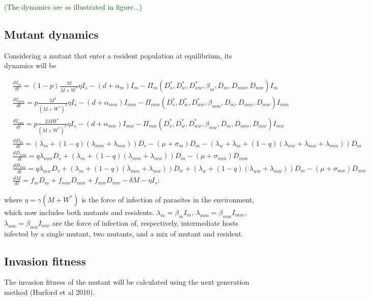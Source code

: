 \documentclass{article}
\newcommand{\cha}[1]{\textcolor{darkgreen}{(#1)}}
\begin{document}
\cha{The dynamics are as illustrated in figure...}

\newpage 
\subsection{Mutant dynamics}

Considering a mutant that enter a resident population at equilibrium, its dynamics will be

\begin{subequations}
\begin{align}
& \frac{dI_m}{dt} = (1 - p) \frac{M}{M + W^*} \eta I_s - (d + \alpha_m) I_m -\Pi_m(D_s^*, D_w^*,  D_{ww}^*,  \beta_m, D_m, D_{mm}, D_{mw}) I_m \\
& \frac{dI_{mm}}{dt} = p \frac{M^2}{(M + W^*)^2} \eta I_s - (d + \alpha_{mm}) I_{mm} - \Pi_{mm}(D_s^*, D_w^*, D_{ww}^*, \beta_{mm}, D_m, D_{mm}, D_{mw}) I_{mm}\\
& \frac{dI_{mw}}{dt} =  p \frac{2 M W^*}{(M + W^*)^2} \eta I_s - (d + \alpha_{mw}) I_{mw} -\Pi_{mw}(D_s^*, D_w^*, D_{ww}^*, \beta_{mw}, D_m, D_{mm}, D_{mw}) I_{mw} \\
& \frac{dD_m}{dt} = ( \lambda_m + (1 - q) (\lambda_{mm} + \lambda_{mw})) D_s - (\mu + \sigma_m) D_m - (\lambda_w + \lambda_m + (1 - q) (\lambda_{ww} + \lambda_{mw} + \lambda_{mm}) ) D_m \\
& \frac{dD_{mm}}{dt} = q \lambda_{mm} D_s + (\lambda_m + (1 - q)(\lambda_{mm} + \lambda_{mw})) D_m - (\mu + \sigma_{mm}) D_{mm} \\
& \frac{dD_{mw}}{dt} = q \lambda_{mw} D_s + (\lambda_m + (1 - q)(\lambda_{mm} + \lambda_{mw})) D_w + (\lambda_w + (1 - q) (\lambda_{ww} + \lambda_{mw})) D_m - (\mu + \sigma_{mw}) D_{mw} \\
& \frac{dM}{dt} = f_m D_m + f_{mm} D_{mm} +  f_{mw} D_{mw} - \delta M - \eta I_s;
\end{align}
\label{odes:mutdynamics}
\end{subequations}

where $\eta =\gamma (M + W^*)$ is the force of infection of parasites in the environment, which now includes both mutants and residents. $\lambda_m = \beta_m I_m$, $\lambda_{mm} = \beta_{mm} I_{mm}$, $\lambda_{mw} = \beta_{mw} I_{mw}$ are the force of infection of, respectively, intermediate hosts infected by a single mutant, two mutants, and a mix of mutant and resident. 

\subsection{Invasion fitness}
The invasion fitness of the mutant will be calculated using the next generation method (Hurford et al 2010).
\end{document}
